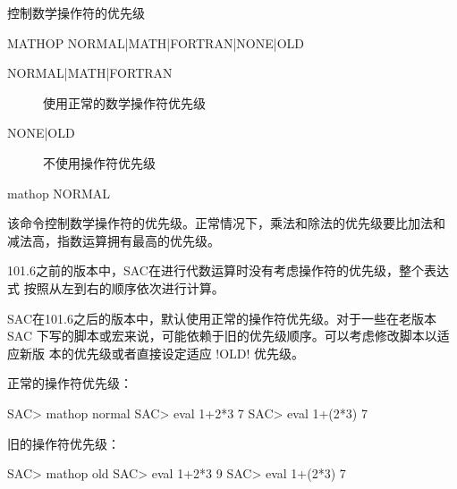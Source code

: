 \label{cmd:mathop}

控制数学操作符的优先级

\begin{SACSTX}
MATHOP NORMAL|MATH|FORTRAN|NONE|OLD
\end{SACSTX}

\begin{description}
\item [NORMAL|MATH|FORTRAN] 使用正常的数学操作符优先级
\item [NONE|OLD] 不使用操作符优先级
\end{description}

\begin{SACDFT}
mathop NORMAL
\end{SACDFT}

该命令控制数学操作符的优先级。正常情况下，乘法和除法的优先级要比加法和
减法高，指数运算拥有最高的优先级。

101.6之前的版本中，SAC在进行代数运算时没有考虑操作符的优先级，整个表达式
按照从左到右的顺序依次进行计算。

SAC在101.6之后的版本中，默认使用正常的操作符优先级。对于一些在老版本SAC
下写的脚本或宏来说，可能依赖于旧的优先级顺序。可以考虑修改脚本以适应新版
本的优先级或者直接设定适应 !OLD! 优先级。

正常的操作符优先级：
\begin{SACCode}
SAC> mathop normal
SAC> eval 1+2*3
 7
SAC> eval 1+(2*3)
 7
\end{SACCode}

旧的操作符优先级：
\begin{SACCode}
SAC> mathop old
SAC> eval 1+2*3
 9
SAC> eval 1+(2*3)
 7
\end{SACCode}
